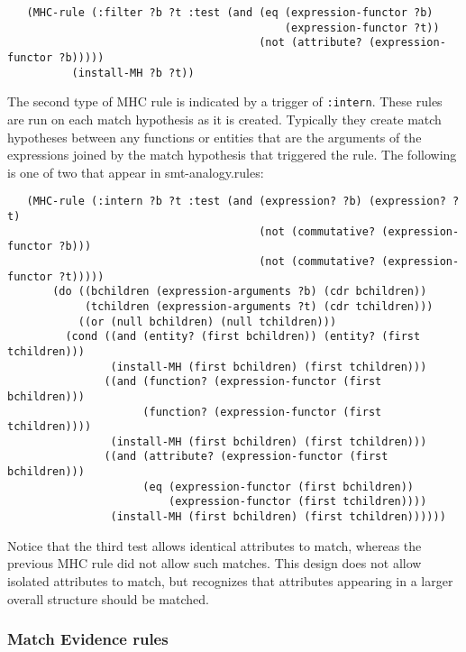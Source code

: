\begin{small}
\begin{verbatim}
   (MHC-rule (:filter ?b ?t :test (and (eq (expression-functor ?b)
                                           (expression-functor ?t))
                                       (not (attribute? (expression-functor ?b)))))
          (install-MH ?b ?t))
\end{verbatim}
\end{small}

The second type of MHC rule is indicated by a trigger of {\tt :intern}.
These rules are run on each match hypothesis as it is created. Typically
they create match hypotheses between any functions or entities that are the
arguments of the expressions joined by the match hypothesis that triggered
the rule. The following is one of two that appear in smt-analogy.rules:

\begin{small}
\begin{verbatim}
   (MHC-rule (:intern ?b ?t :test (and (expression? ?b) (expression? ?t)
                                       (not (commutative? (expression-functor ?b)))
                                       (not (commutative? (expression-functor ?t)))))
       (do ((bchildren (expression-arguments ?b) (cdr bchildren))
            (tchildren (expression-arguments ?t) (cdr tchildren)))
           ((or (null bchildren) (null tchildren)))
         (cond ((and (entity? (first bchildren)) (entity? (first tchildren)))
                (install-MH (first bchildren) (first tchildren)))
               ((and (function? (expression-functor (first bchildren)))
                     (function? (expression-functor (first tchildren))))
                (install-MH (first bchildren) (first tchildren)))
               ((and (attribute? (expression-functor (first bchildren)))
                     (eq (expression-functor (first bchildren))
                         (expression-functor (first tchildren))))
                (install-MH (first bchildren) (first tchildren))))))
\end{verbatim}
\end{small}

Notice that the third test allows identical attributes to match, whereas the
previous MHC rule did not allow such matches. This design does not allow
isolated attributes to match, but recognizes that attributes appearing in a
larger overall structure should be matched.


\subsubsection{Match Evidence rules}\label{ss:ME-rules}

